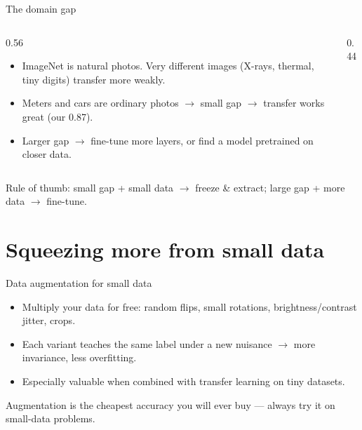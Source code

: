 \documentclass[10pt,aspectratio=169]{beamer}
\begin{document}
\begin{frame}{The domain gap}
  \begin{columns}[T]
    \begin{column}{0.56\textwidth}
      \begin{itemize}
        \item ImageNet is natural photos. Very different images (X-rays, thermal, tiny
              digits) transfer more weakly.
        \item Meters and cars are ordinary photos $\rightarrow$ small gap $\rightarrow$ transfer
              works great (our 0.87).
        \item Larger gap $\rightarrow$ fine-tune more layers, or find a model pretrained on
              closer data.
      \end{itemize}
    \end{column}
    \begin{column}{0.44\textwidth}
    \end{column}
  \end{columns}
  \begin{mathbox}
    Rule of thumb: small gap + small data $\rightarrow$ freeze \& extract; large gap + more data $\rightarrow$ fine-tune.
  \end{mathbox}
\end{frame}

\section{Squeezing more from small data}

\begin{frame}{Data augmentation for small data}
  \begin{itemize}
    \item Multiply your data for free: random flips, small rotations, brightness/contrast jitter, crops.
    \item Each variant teaches the same label under a new nuisance $\rightarrow$ more invariance, less overfitting.
    \item Especially valuable when combined with transfer learning on tiny datasets.
  \end{itemize}
  \begin{goodbox}
    Augmentation is the cheapest accuracy you will ever buy — always try it on small-data problems.
  \end{goodbox}
\end{frame}
\end{document}
